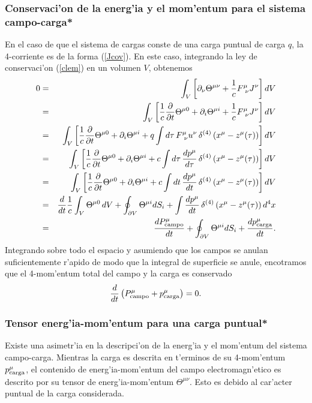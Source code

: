\subsubsection{Conservaci'on de la energ'ia y el mom'entum para el sistema
campo-carga*}

En el caso de que el sistema de cargas conste de una carga puntual de carga $q$,
la 4-corriente es de la forma (\ref{Jcov}). En este caso, integrando la ley de
conservaci'on (\ref{clem}) en un volumen $V$, obtenemos
\begin{eqnarray}
0&=&\int_V \left[ \partial_\nu \Theta^{\mu\nu}+\frac{1}{c} F^\mu_{\
\nu}J^\nu\right]  dV \\
&=&\int_V \left[\frac{1}{c} \frac{\partial}{\partial t} \Theta^{\mu
0}+\partial_i \Theta^{\mu i}+\frac{1}{c} F^\mu_{\ \nu}J^\nu\right]  dV \\
&=&\int_V \left[\frac{1}{c} \frac{\partial}{\partial t} \Theta^{\mu
0}+\partial_i \Theta^{\mu i}+q\int d\tau\,  F^\mu_{\
\nu}u^\nu\,\delta^{(4)}\left(x^\mu-z^\mu(\tau)\right)\right]  dV \\
&=&\int_V \left[\frac{1}{c} \frac{\partial}{\partial t} \Theta^{\mu
0}+\partial_i \Theta^{\mu i}+c\int d\tau\,
\frac{dp^\mu}{d\tau}\,\delta^{(4)}\left(x^\mu-z^\mu(\tau)\right)\right]  dV \\
&=&\int_V \left[\frac{1}{c} \frac{\partial}{\partial t} \Theta^{\mu
0}+\partial_i \Theta^{\mu i}+c\int dt\,
\frac{dp^\mu}{dt}\,\delta^{(4)}\left(x^\mu-z^\mu(\tau)\right)\right]  dV
\\
&=&\frac{d}{dt}\frac{1}{c}\int_V  \Theta^{\mu 0}\,dV+\oint_{\partial V}\Theta^{\mu
i}dS_i+\int \frac{dp^\mu}{dt}\,\delta^{(4)}\left(x^\mu-z^\mu(\tau)\right)  d^4x
\\
&=&\frac{dP^\mu_{\rm campo}}{dt}+\oint_{\partial V}\Theta^{\mu
i}dS_i+\frac{dp^\mu_{\rm carga}}{dt}.
\end{eqnarray}
Integrando sobre todo el espacio y asumiendo que los campos se anulan
suficientemente r'apido de modo que la integral de superficie se anule,
encotramos que el 4-mom'entum total del campo y la carga es conservado
\begin{equation}
\frac{d}{dt}\left( P^\mu_{\rm campo}+p^\mu_{\rm carga}\right) =0.
\end{equation}

\subsubsection{Tensor energ'ia-mom'entum para una carga puntual*}
Existe una asimetr'ia en la descripci'on de la energ'ia y el mom'entum del
sistema campo-carga. Mientras la carga es descrita en t'erminos de su 4-mom'entum
$p^\mu_{\rm carga}$, el contenido de energ'ia-mom'entum del campo
electromagn'etico es descrito por su tensor de energ'ia-mom'entum
$\Theta^{\mu\nu}$. Esto es debido al car'acter puntual de la carga considerada.

